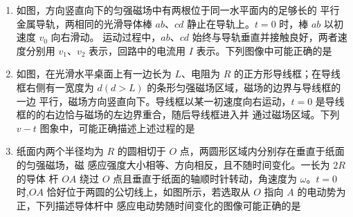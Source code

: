 \begin{enumerate}
\item 
{}
如图，方向竖直向下的匀强磁场中有两根位于同一水平面内的足够长的
平行金属导轨，两相同的光滑导体棒 $ ab $、$ cd $ 静止在导轨上。$ t=0 $ 时，棒 $ ab $ 以初速度 $ v_{0} $ 向右滑动。
运动过程中，$ ab $、$ cd $ 始终与导轨垂直并接触良好，两者速度分别用 $ v_{1} $、$ v_{2} $ 表示，回路中的电流用 $ I $
表示。下列图像中可能正确的是  
\begin{figure}[h!]
\centering

\end{figure}


\pfourchoices
{}
{}
{}
{}





\item 
{}
如图，在光滑水平桌面上有一边长为 $ L $、电阻为 $ R $ 的正方形导线框；在导线框右侧有一宽度为
$ d ( d>L) $ 的条形匀强磁场区域，磁场的边界与导线框的一边
平行，磁场方向竖直向下。导线框以某一初速度向右运动，$ t=0 $
是导线框的的右边恰与磁场的左边界重合，随后导线框进入并
通过磁场区域。下列 $ v-t $ 图象中，可能正确描述上述过程的是  
\begin{figure}[h!]
\centering

\end{figure}


\pfourchoices
{}
{}
{}
{}




\item
{}
纸面内两个半径均为 $ R $ 的圆相切于 $ O $ 点，两圆形区域内分别存在垂直于纸面的匀强磁场，磁
感应强度大小相等、方向相反，且不随时间变化。一长为 $ 2R $ 的导体
杆 $ OA $ 绕过 $ O $ 点且垂直于纸面的轴顺时针转动，角速度为 $ \omega $。$ t=0 $
时,$ OA $ 恰好位于两圆的公切线上，如图所示，若选取从 $ O $ 指向 $ A $ 的电动势为正，下列描述导体杆中
感应电动势随时间变化的图像可能正确的是  
\begin{figure}[h!]
\centering

\end{figure}


\end{enumerate}
